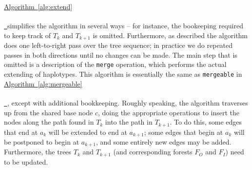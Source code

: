 \documentclass[10pt,twoside,lineno]{gsajnl}
\newcommand{\algorithmref}[2][]{%
	\hyperref[{#2}]{%
		Algorithm~\ref*{#2}%
		\ifx\\#1\\%
		\else
		\,#1%
		\fi
	}%
}
\begin{document}
\algorithmref{alg:extend} simplifies the algorithm in several ways --
for instance, the bookeeping required to keep track of $T_k$ and $T_{k+1}$ is omitted.
Furthermore, as described the algorithm does one left-to-right pass over the tree sequence;
in practice we do repeated passes in both directions until no changes can be made.
The main step that is omitted is a description of the \texttt{merge} operation,
which performs the actual extending of haplotypes.
This algorithm is essentially the same as \texttt{mergeable} in \algorithmref{alg:mergeable},
except with additional bookkeeping.
Roughly speaking, the algorithm
traverses up from the shared base node $c$,
doing the appropriate operations to insert the nodes along the path found in $T_k$
into the path in $T_{k+1}$.
To do this, some edges that end at $a_k$ will be extended to end at $a_{k+1}$;
some edges that begin at $a_k$ will be postponed to begin at $a_{k+1}$,
and some entirely new edges may be added.
Furthermore, the trees $T_k$ and $T_{k+1}$ (and corresponding forests $F_O$ and $F_I$)
need to be updated.
\end{document}
